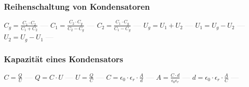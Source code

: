 \subsubsection{Reihenschaltung von Kondensatoren} 
\begin{minipage}{0.45\textwidth} 
\end{minipage} 
\begin{minipage}{0.45\textwidth} 
 
\end{minipage} 
$ C_{g}  = \frac{C_{1} \cdot C_{2} }{C_{1} +C_{2} } $ \textcolor{lightgray}{\textbf{---}} 
$ C_{1}  = \frac{C_{2} \cdot C_{g} }{C_{2} -C_{g} } $ \textcolor{lightgray}{\textbf{---}} 
$ C_{2}  = \frac{C_{1} \cdot C_{g} }{C_{1} -C_{g} } $ \textcolor{lightgray}{\textbf{---}} 
$ U_{g}  = U_{1}  + U_{2} $ \textcolor{lightgray}{\textbf{---}} 
$ U_{1}  = U_{g}  - U_{2} $ \textcolor{lightgray}{\textbf{---}} 
$ U_{2}  = U_{g}  - U_{1} $ \textcolor{lightgray}{\textbf{---}} 

\subsubsection{Kapazität eines Kondensators} 
\begin{minipage}{0.45\textwidth} 
\end{minipage} 
\begin{minipage}{0.45\textwidth} 
 
\end{minipage} 
$ C = \frac{Q}{U} $ \textcolor{lightgray}{\textbf{---}} 
$ Q = C\cdot U $ \textcolor{lightgray}{\textbf{---}} 
$ U = \frac{Q}{C} $ \textcolor{lightgray}{\textbf{---}} 
$ C = \epsilon _{0} \cdot \epsilon _{r} \cdot \frac{A}{d} $ \textcolor{lightgray}{\textbf{---}} 
$ A = \frac{C\cdot d}{\epsilon _{0} \epsilon _{r} } $ \textcolor{lightgray}{\textbf{---}} 
$ d = \epsilon _{0} \cdot \epsilon _{r} \cdot \frac{A}{C} $ \textcolor{lightgray}{\textbf{---}} 

